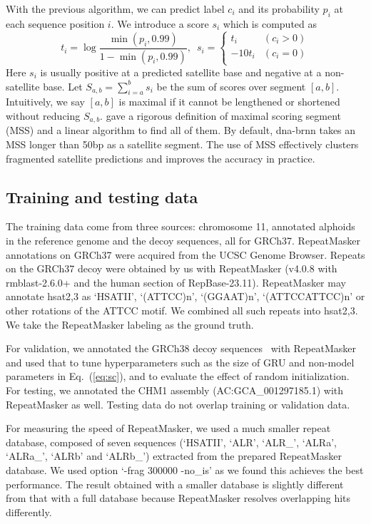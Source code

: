 \documentclass{bioinfo}
\begin{document}
\begin{methods}
With the previous algorithm, we can predict label $c_i$ and its
probability $p_i$ at each sequence position $i$. We
introduce a score $s_i$ which is computed as
\begin{equation}\label{eq:sc}
t_i=\log\frac{\min(p_i,0.99)}{1-\min(p_i,0.99)},\,\,\,
s_i=\left\{\begin{array}{ll}
t_i & (c_i>0) \\
-10t_i & (c_i=0)\\
\end{array}\right.
\end{equation}
Here $s_i$ is usually positive at a predicted satellite base and negative at a
non-satellite base. Let $S_{a,b}=\sum_{i=a}^b s_i$
be the sum of scores over segment $[a,b]$. Intuitively, we say $[a,b]$ is
maximal if it cannot be lengthened or shortened without reducing $S_{a,b}$.
\citet{DBLP:conf/ismb/RuzzoT99} gave a rigorous definition of maximal scoring
segment (MSS) and a linear algorithm to find all of them. By default,
dna-brnn takes an MSS longer than 50bp as a satellite segment. The use of MSS
effectively clusters fragmented satellite predictions and improves the accuracy
in practice.

\subsection{Training and testing data}

The training data come from three sources: chromosome 11, annotated alphoids in
the reference genome and the decoy sequences, all for GRCh37.  RepeatMasker
annotations on GRCh37 were acquired from the UCSC Genome Browser.  Repeats on
the GRCh37 decoy were obtained by us with RepeatMasker (v4.0.8 with rmblast-2.6.0+ and the human section of
RepBase-23.11). RepeatMasker may annotate hsat2,3 as
`HSATII', `(ATTCC)n', `(GGAAT)n', `(ATTCCATTCC)n' or other rotations of the
ATTCC motif. We combined all such repeats into hsat2,3. We take the
RepeatMasker labeling as the ground truth.

For validation, we annotated the GRCh38 decoy sequences~\citep{Mallick:2016aa}
with RepeatMasker and used that to tune hyperparameters such as the size of
GRU and non-model parameters in Eq.~(\ref{eq:sc}), and to evaluate the effect
of random initialization. For testing, we annotated the CHM1 assembly
(AC:GCA\_001297185.1) with RepeatMasker as well. Testing data do not overlap
training or validation data.

For measuring the speed of RepeatMasker, we used a much smaller repeat
database, composed of seven sequences (`HSATII', `ALR', `ALR\_', `ALRa',
`ALRa\_', `ALRb' and `ALRb\_') extracted from the prepared RepeatMasker
database. We used option `-frag 300000 -no\_is' as we found this achieves the
best performance. The result obtained with a smaller database is slightly
different from that with a full database because RepeatMasker resolves
overlapping hits differently.


\end{methods}
\end{document}
